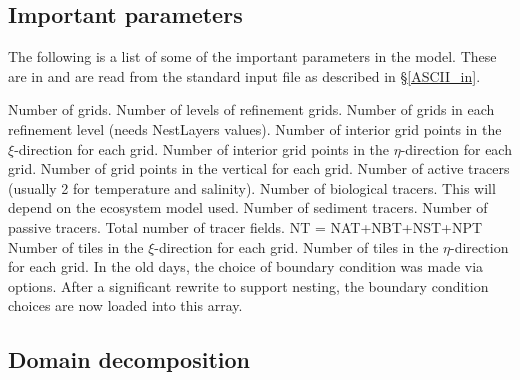 \subsection{Important parameters}
\label{Parms}
The following is a list of some of the important parameters in the
model. These are in  and are read from the
standard input file as described in \S\ref{ASCII_in}.
\begin{klist}
   Number of grids.
   Number of levels of refinement grids.
   Number of grids in each refinement level
    (needs NestLayers values).
   Number of interior grid points in the $\xi$-direction
  for each grid.
   Number of interior grid points in the $\eta$-direction
  for each grid.
   Number of grid points in the vertical for each grid.
   Number of active tracers (usually 2 for temperature and
    salinity).
   Number of biological tracers. This will depend on the
    ecosystem model used.
   Number of sediment tracers.
   Number of passive tracers.
   Total number of tracer fields. NT = NAT+NBT+NST+NPT
   Number of tiles in the $\xi$-direction for each
    grid.
   Number of tiles in the $\eta$-direction for each
    grid.
   In the old days, the choice of boundary condition was
    made via  options. After a significant rewrite to
    support nesting, the boundary condition choices are now loaded
    into this array.
\end{klist}

\subsection{Domain decomposition}
\label{Tiles}

